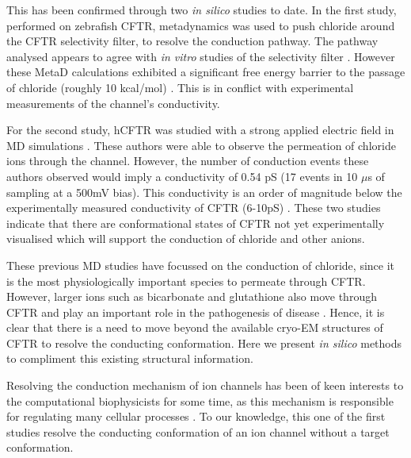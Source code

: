 This has been confirmed through two \textit{in silico} studies to date. In the first study, performed on zebrafish CFTR, metadynamics was used to push chloride around the CFTR selectivity filter, to resolve the conduction pathway. The pathway analysed appears to agree with \textit{in vitro} studies of the selectivity filter \cite{}. However these MetaD calculations exhibited a significant free energy barrier to the passage of chloride (roughly 10 kcal/mol) \cite{farkas2020}. This is in conflict with experimental measurements of the channel's conductivity. 

For the second study, hCFTR was studied with a strong applied electric field in MD simulations \cite{zeng2021}. These authors were able to observe the permeation of chloride ions through the channel. However, the number of conduction events these authors observed would imply a conductivity of 0.54 pS (17 events in 10 $\mu$s of sampling at a 500mV bias). This conductivity is an order of magnitude below the experimentally measured conductivity of CFTR (6-10pS) \cite{gong2004, lee2007, linsdell2001, sheppard1999}. These two studies indicate that there are conformational states of CFTR not yet experimentally visualised which will support the conduction of chloride and other anions. 

These previous MD studies have focussed on the conduction of chloride, since it is the most physiologically important species to permeate through CFTR. However, larger ions such as bicarbonate and glutathione also move through CFTR and play an important role in the pathogenesis of disease \cite{gao1999, kogan2003, linsdell1998, tang2009, larusch2014, jun2016}. Hence, it is clear that there is a need to move beyond the available cryo-EM structures of CFTR to resolve the conducting conformation. Here we present \textit{in silico} methods to compliment this existing structural information. 


Resolving the conduction mechanism of ion channels has been of keen interests to the computational biophysicists for some time, as this mechanism is responsible for regulating many cellular processes \cite{black2020, flood2019}. To our knowledge, this one of the first studies resolve the conducting conformation of an ion channel without a target conformation. 

